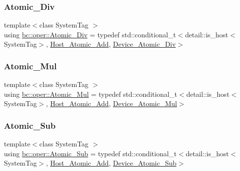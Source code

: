\mbox{\label{namespacebc_1_1oper_a771719f0c74d9cf102904d49dc4f238b}} 
\subsubsection{\texorpdfstring{Atomic\+\_\+\+Div}{Atomic\_Div}}
{\footnotesize\ttfamily template$<$class System\+Tag $>$ \\
using \hyperlink{namespacebc_1_1oper_a771719f0c74d9cf102904d49dc4f238b}{bc\+::oper\+::\+Atomic\+\_\+\+Div} = typedef std\+::conditional\+\_\+t$<$detail\+::is\+\_\+host$<$System\+Tag$>$, \hyperlink{structbc_1_1oper_1_1Host__Atomic__Add}{Host\+\_\+\+Atomic\+\_\+\+Add}, \hyperlink{structbc_1_1oper_1_1Device__Atomic__Div}{Device\+\_\+\+Atomic\+\_\+\+Div}$>$}

\mbox{\label{namespacebc_1_1oper_aff547ee764d8dc38221c93bca5f9f159}} 
\subsubsection{\texorpdfstring{Atomic\+\_\+\+Mul}{Atomic\_Mul}}
{\footnotesize\ttfamily template$<$class System\+Tag $>$ \\
using \hyperlink{namespacebc_1_1oper_aff547ee764d8dc38221c93bca5f9f159}{bc\+::oper\+::\+Atomic\+\_\+\+Mul} = typedef std\+::conditional\+\_\+t$<$detail\+::is\+\_\+host$<$System\+Tag$>$, \hyperlink{structbc_1_1oper_1_1Host__Atomic__Add}{Host\+\_\+\+Atomic\+\_\+\+Add}, \hyperlink{structbc_1_1oper_1_1Device__Atomic__Mul}{Device\+\_\+\+Atomic\+\_\+\+Mul}$>$}

\mbox{\label{namespacebc_1_1oper_a2c653b5c683b56d4bc7766130831fa8a}} 
\subsubsection{\texorpdfstring{Atomic\+\_\+\+Sub}{Atomic\_Sub}}
{\footnotesize\ttfamily template$<$class System\+Tag $>$ \\
using \hyperlink{namespacebc_1_1oper_a2c653b5c683b56d4bc7766130831fa8a}{bc\+::oper\+::\+Atomic\+\_\+\+Sub} = typedef std\+::conditional\+\_\+t$<$detail\+::is\+\_\+host$<$System\+Tag$>$, \hyperlink{structbc_1_1oper_1_1Host__Atomic__Add}{Host\+\_\+\+Atomic\+\_\+\+Add}, \hyperlink{structbc_1_1oper_1_1Device__Atomic__Sub}{Device\+\_\+\+Atomic\+\_\+\+Sub}$>$}



